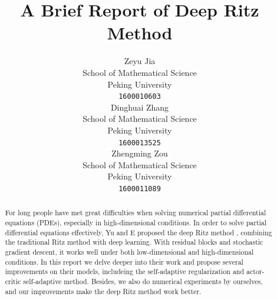 \documentclass{article}
\title{A Brief Report of Deep Ritz Method}
\author{
  Zeyu Jia\\School of Mathematical Science\\Peking University\\ \texttt{1600010603} \\
  \And
  Dinghuai Zhang\\School of Mathematical Science\\Peking University\\ \texttt{1600013525}\\
  \And
  Zhengming Zou\\School of Mathematical Science\\Peking University \\ \texttt{1600011089}
}
\begin{document}

\maketitle

\begin{abstract}
\par For long people have met great difficulties when solving numerical partial differential equations (PDEs), especially in high-dimensional conditions. In order to solve partial differential equations effectively, Yu and E proposed the deep Ritz method \cite{yu2017deep}, combining the traditional Ritz method with deep learning. With residual blocks and stochastic gradient descent, it works well under both low-dimensional and high-dimensional conditions. In this report we delve deeper into their work and propose several improvements on their models, includeing the self-adaptive regularization and actor-critic self-adaptive method. Besides, we also do numerical experiments by ourselves, and our improvements make the deep Ritz method work better. 
\end{abstract}
\end{document}
